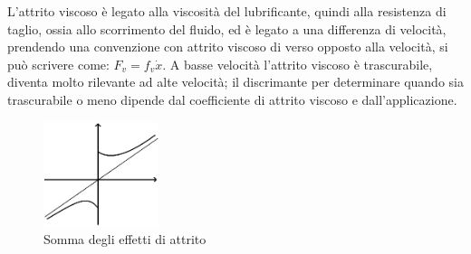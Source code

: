 L'attrito viscoso è legato alla viscosità del lubrificante, quindi alla resistenza di taglio, ossia allo scorrimento del fluido, ed è legato a una differenza di velocità, prendendo una convenzione con attrito viscoso di verso opposto alla velocità, si può scrivere come: $F_v=f_v \dot{x}$.
A basse velocità l'attrito viscoso è trascurabile, diventa molto rilevante ad alte velocità; il discrimante per determinare quando sia trascurabile o meno dipende dal coefficiente di attrito viscoso e dall'applicazione.

\begin{figure}[h]
    \centering
    \includegraphics[width=0.3\textwidth]{Immagini/somma_effetti_attrito.png}
    \caption{Somma degli effetti di attrito}
\end{figure}